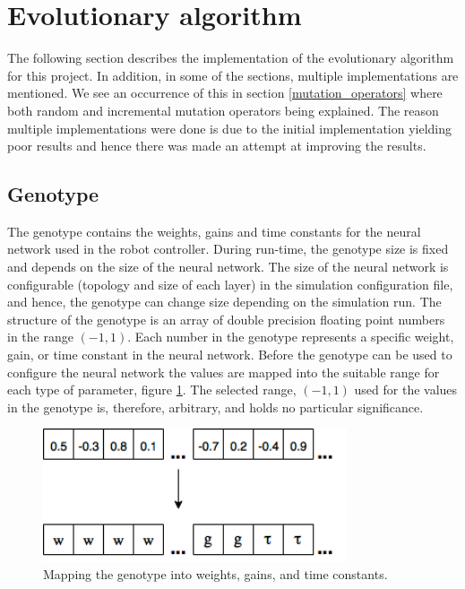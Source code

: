 \section{Evolutionary algorithm}
The following section describes the implementation of the evolutionary algorithm for this project.
In addition, in some of the sections, multiple implementations are mentioned.
We see an occurrence of this in section \ref{mutation_operators} where both random and incremental mutation operators being explained.
The reason multiple implementations were done is due to the initial implementation yielding poor results and hence there was made an attempt at improving the results.

\subsection{Genotype}
\label{sec:genotype}
The genotype contains the weights, gains and time constants for the neural network used in the robot controller.
During run-time, the genotype size is fixed and depends on the size of the neural network.
The size of the neural network is configurable (topology and size of each layer) in the simulation configuration file, and hence, the genotype can change size depending on the simulation run.
The structure of the genotype is an array of double precision floating point numbers in the range $(-1, 1)$.
Each number in the genotype represents a specific weight, gain, or time constant in the neural network.
Before the genotype can be used to configure the neural network the values are mapped into the suitable range for each type of parameter, figure \ref{fig:genotype-mapping}.
The selected range, $(-1, 1)$ used for the values in the genotype is, therefore, arbitrary, and holds no particular significance. 

\begin{figure}[H]        
	\centering
	\includegraphics[width=0.80\textwidth, clip]{chapters/res/genotype_translation.png}
	\caption{Mapping the genotype into weights, gains, and time constants.}
	\label{fig:genotype-mapping}
\end{figure}

